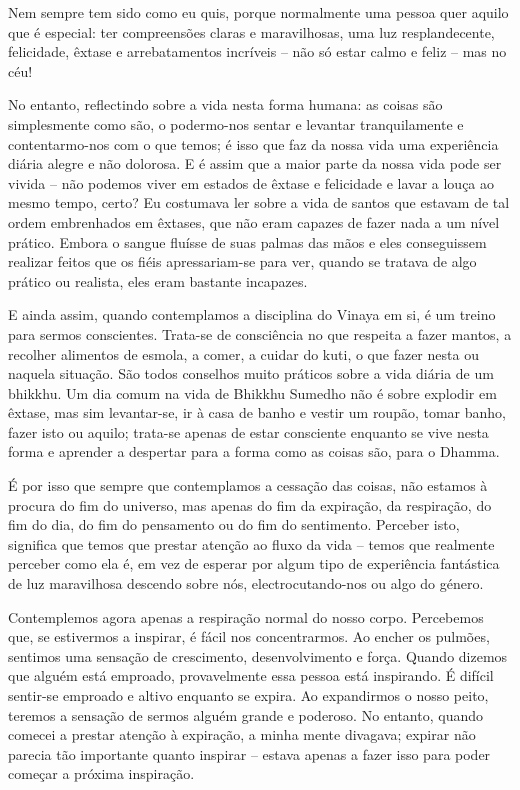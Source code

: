Nem sempre tem sido como eu quis, porque normalmente uma pessoa quer aquilo que
é especial: ter compreensões claras e maravilhosas, uma luz resplandecente,
felicidade, êxtase e arrebatamentos incríveis -- não só estar calmo e feliz --
mas no céu!

No entanto, reflectindo sobre a vida nesta forma humana: as coisas são
simplesmente como são, o podermo-nos sentar e levantar tranquilamente e
contentarmo-nos com o que temos; é isso que faz da nossa vida uma experiência
diária alegre e não dolorosa. E é assim que a maior parte da nossa vida pode ser
vivida -- não podemos viver em estados de êxtase e felicidade e lavar a louça ao
mesmo tempo, certo? Eu costumava ler sobre a vida de santos que estavam de tal
ordem embrenhados em êxtases, que não eram capazes de fazer nada a um nível
prático. Embora o sangue fluísse de suas palmas das mãos e eles conseguissem
realizar feitos que os fiéis apressariam-se para ver, quando se tratava de algo
prático ou realista, eles eram bastante incapazes.

E ainda assim, quando contemplamos a disciplina do Vinaya em si, é um treino
para sermos conscientes. Trata-se de consciência no que respeita a fazer
mantos, a recolher alimentos de esmola, a comer, a cuidar do kuti, o que fazer
nesta ou naquela situação. São todos conselhos muito práticos sobre a vida
diária de um bhikkhu. Um dia comum na vida de Bhikkhu Sumedho não é sobre
explodir em êxtase, mas sim levantar-se, ir à casa de banho e vestir um roupão,
tomar banho, fazer isto ou aquilo; trata-se apenas de estar consciente enquanto
se vive nesta forma e aprender a despertar para a forma como as coisas são, para
o Dhamma.

É por isso que sempre que contemplamos a cessação das coisas, não estamos à
procura do fim do universo, mas apenas do fim da expiração, da respiração, do
fim do dia, do fim do pensamento ou do fim do sentimento. Perceber isto,
significa que temos que prestar atenção ao fluxo da vida -- temos que realmente
perceber como ela é, em vez de esperar por algum tipo de experiência fantástica
de luz maravilhosa descendo sobre nós, electrocutando-nos ou algo do género.

Contemplemos agora apenas a respiração normal do nosso corpo. Percebemos que, se
estivermos a inspirar, é fácil nos concentrarmos. Ao encher os pulmões, sentimos
uma sensação de crescimento, desenvolvimento e força. Quando dizemos que alguém
está emproado, provavelmente essa pessoa está inspirando. É difícil sentir-se
emproado e altivo enquanto se expira. Ao expandirmos o nosso peito, teremos a
sensação de sermos alguém grande e poderoso. No entanto, quando comecei a
prestar atenção à expiração, a minha mente divagava; expirar não parecia tão
importante quanto inspirar -- estava apenas a fazer isso para poder começar a
próxima inspiração.

